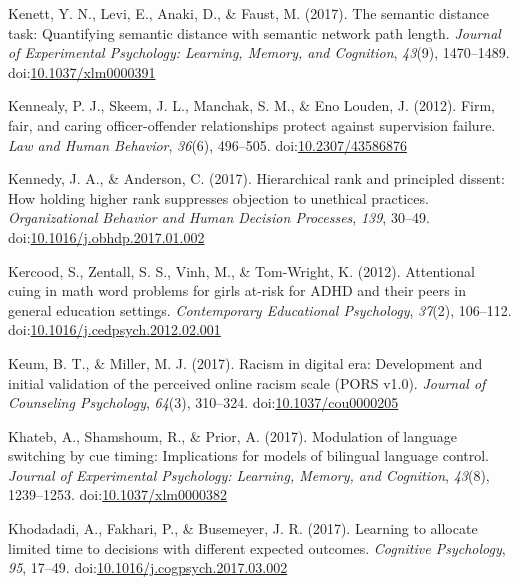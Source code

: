 \documentclass[english,man]{apa6}
\begin{document}
\hypertarget{ref-Kenett2017}{}
Kenett, Y. N., Levi, E., Anaki, D., \& Faust, M. (2017). The semantic
distance task: Quantifying semantic distance with semantic network path
length. \emph{Journal of Experimental Psychology: Learning, Memory, and
Cognition}, \emph{43}(9), 1470--1489.
doi:\href{https://doi.org/10.1037/xlm0000391}{10.1037/xlm0000391}

\hypertarget{ref-Kennealy2012}{}
Kennealy, P. J., Skeem, J. L., Manchak, S. M., \& Eno Louden, J. (2012).
Firm, fair, and caring officer-offender relationships protect against
supervision failure. \emph{Law and Human Behavior}, \emph{36}(6),
496--505. doi:\href{https://doi.org/10.2307/43586876}{10.2307/43586876}

\hypertarget{ref-Kennedy2017}{}
Kennedy, J. A., \& Anderson, C. (2017). Hierarchical rank and principled
dissent: How holding higher rank suppresses objection to unethical
practices. \emph{Organizational Behavior and Human Decision Processes},
\emph{139}, 30--49.
doi:\href{https://doi.org/10.1016/j.obhdp.2017.01.002}{10.1016/j.obhdp.2017.01.002}

\hypertarget{ref-Kercood2012}{}
Kercood, S., Zentall, S. S., Vinh, M., \& Tom-Wright, K. (2012).
Attentional cuing in math word problems for girls at-risk for ADHD and
their peers in general education settings. \emph{Contemporary
Educational Psychology}, \emph{37}(2), 106--112.
doi:\href{https://doi.org/10.1016/j.cedpsych.2012.02.001}{10.1016/j.cedpsych.2012.02.001}

\hypertarget{ref-Keum2017}{}
Keum, B. T., \& Miller, M. J. (2017). Racism in digital era: Development
and initial validation of the perceived online racism scale (PORS v1.0).
\emph{Journal of Counseling Psychology}, \emph{64}(3), 310--324.
doi:\href{https://doi.org/10.1037/cou0000205}{10.1037/cou0000205}

\hypertarget{ref-Khateb2017}{}
Khateb, A., Shamshoum, R., \& Prior, A. (2017). Modulation of language
switching by cue timing: Implications for models of bilingual language
control. \emph{Journal of Experimental Psychology: Learning, Memory, and
Cognition}, \emph{43}(8), 1239--1253.
doi:\href{https://doi.org/10.1037/xlm0000382}{10.1037/xlm0000382}

\hypertarget{ref-Khodadadi2017}{}
Khodadadi, A., Fakhari, P., \& Busemeyer, J. R. (2017). Learning to
allocate limited time to decisions with different expected outcomes.
\emph{Cognitive Psychology}, \emph{95}, 17--49.
doi:\href{https://doi.org/10.1016/j.cogpsych.2017.03.002}{10.1016/j.cogpsych.2017.03.002}
\end{document}

